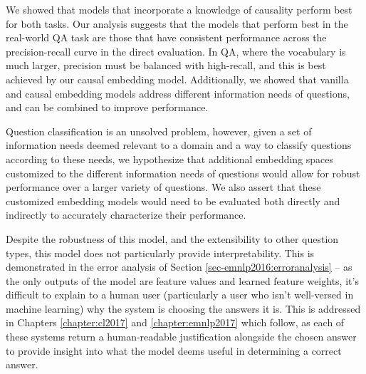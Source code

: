 We showed that models that incorporate a knowledge of causality perform best for both tasks. 
Our analysis suggests that the models that perform best in the real-world QA task are those that have consistent performance across the precision-recall curve in the direct evaluation.
In QA, where the vocabulary is much larger, precision must be balanced with high-recall, and this is best achieved by our causal embedding model.  Additionally, we showed that vanilla and causal embedding models address different information needs of questions, and can be combined to improve performance. 

Question classification is an unsolved problem, however, given a set of information needs deemed relevant to a domain and a way to classify questions according to these needs,  we hypothesize that additional embedding spaces customized to the different information needs of questions would allow for robust performance over a larger variety of questions.   
We also assert that these customized embedding models would need to be evaluated both directly and indirectly to accurately characterize their performance.  

Despite the robustness of this model, and the extensibility to other question types, this model does not particularly provide interpretability.  This is demonstrated in the error analysis of Section \ref{sec-emnlp2016:erroranalysis} -- as the only outputs of the model are feature values and learned feature weights, it's difficult to explain to a human user (particularly a user who isn't well-versed in machine learning) why the system is choosing the answers it is.  This is addressed in Chapters \ref{chapter:cl2017} and \ref{chapter:emnlp2017} which follow, as each of these systems return a human-readable justification alongside the chosen answer to provide insight into what the model deems useful in determining a correct answer.



